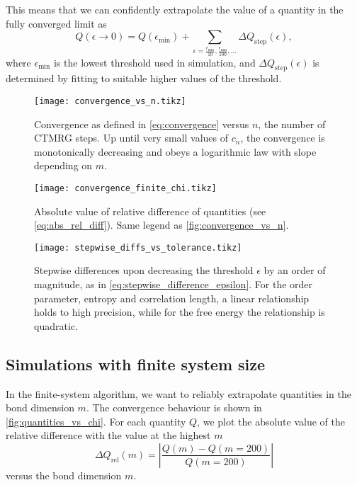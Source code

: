 
This means that we can confidently extrapolate the value of a quantity in the fully converged limit as
\begin{equation}\label{eq:extrapolation_fully_converged_limit_finite_m}
  Q(\epsilon \to 0) = Q(\epsilon_{\text{min}}) + \sum_{\epsilon = \frac{\epsilon_{\text{min}}}{10},
  \frac{\epsilon_{\text{min}}}{100}, \dots} \Delta Q_{\text{step}}(\epsilon),
\end{equation}
where $\epsilon_{\text{min}}$ is the lowest threshold used in simulation, and $\Delta Q_{\text{step}}(\epsilon)$ is determined
by fitting to suitable higher values of the threshold.

\begin{figure}
  \texttt{[image: convergence\_vs\_n.tikz]}
  \caption{Convergence as defined in \autoref{eq:convergence} versus $n$, the number of CTMRG
  steps.
  Up until very small values of $c_n$, the convergence is monotonically decreasing and obeys
  a logarithmic law with slope depending on $m$.}\label{fig:convergence_vs_n}
\end{figure}

\begin{figure}
  \texttt{[image: convergence\_finite\_chi.tikz]}
  \caption{Absolute value of relative difference of quantities (see \autoref{eq:abs_rel_diff}).
  Same legend as \autoref{fig:convergence_vs_n}.}\label{fig:convergence_finite_chi}
\end{figure}

\begin{figure}
  \texttt{[image: stepwise\_diffs\_vs\_tolerance.tikz]}
  \caption{Stepwise differences upon decreasing the threshold $\epsilon$ by an order of magnitude,
  as in \autoref{eq:stepwise_difference_epsilon}.
  For the order parameter, entropy and correlation length, a linear relationship holds to high precision,
  while for the free energy the relationship is quadratic.}\label{fig:stepwise_diffs_vs_tolerance}
\end{figure}

\subsection{Simulations with finite system size}\label{sec:simulations_with_finite_system_size}
In the finite-system algorithm, we want to reliably extrapolate quantities in the bond dimension $m$.
The convergence behaviour is shown in \autoref{fig:quantities_vs_chi}.
For each quantity $Q$, we plot the absolute value of the relative difference with the value at the highest $m$
\begin{equation}\label{eq:abs_rel_diff_quantity_m}
  \Delta Q_{\text{rel}}(m) = \left| \frac{Q(m) - Q(m = 200)}{Q(m = 200)} \right|
\end{equation}
versus the bond dimension $m$.

